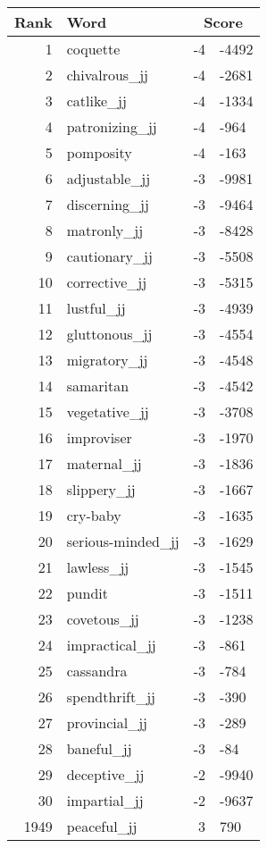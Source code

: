 \begin{longtable}[!htbp]{| rlr@{.}l |}
    \hline
    \textbf{Rank} & \textbf{Word} & \multicolumn{2}{c|}{\textbf{Score}} \\
    \hline
    \endhead
    1 & coquette & -4 & -4492 \\
    2 & chivalrous\_jj & -4 & -2681 \\
    3 & catlike\_jj & -4 & -1334 \\
    4 & patronizing\_jj & -4 & -964 \\
    5 & pomposity & -4 & -163 \\
    6 & adjustable\_jj & -3 & -9981 \\
    7 & discerning\_jj & -3 & -9464 \\
    8 & matronly\_jj & -3 & -8428 \\
    9 & cautionary\_jj & -3 & -5508 \\
    10 & corrective\_jj & -3 & -5315 \\
    11 & lustful\_jj & -3 & -4939 \\
    12 & gluttonous\_jj & -3 & -4554 \\
    13 & migratory\_jj & -3 & -4548 \\
    14 & samaritan & -3 & -4542 \\
    15 & vegetative\_jj & -3 & -3708 \\
    16 & improviser & -3 & -1970 \\
    17 & maternal\_jj & -3 & -1836 \\
    18 & slippery\_jj & -3 & -1667 \\
    19 & cry-baby & -3 & -1635 \\
    20 & serious-minded\_jj & -3 & -1629 \\
    21 & lawless\_jj & -3 & -1545 \\
    22 & pundit & -3 & -1511 \\
    23 & covetous\_jj & -3 & -1238 \\
    24 & impractical\_jj & -3 & -861 \\
    25 & cassandra & -3 & -784 \\
    26 & spendthrift\_jj & -3 & -390 \\
    27 & provincial\_jj & -3 & -289 \\
    28 & baneful\_jj & -3 & -84 \\
    29 & deceptive\_jj & -2 & -9940 \\
    30 & impartial\_jj & -2 & -9637 \\
    1949 & peaceful\_jj & 3 & 790 \\

\end{longtable}
